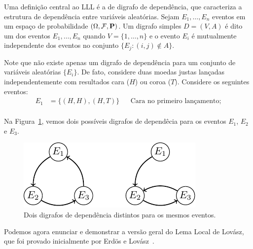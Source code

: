 Uma definição central ao LLL é a de digrafo de dependência, que caracteriza a estrutura de dependência entre variáveis aleatórias. Sejam $E_1, \dots, E_n$ eventos em um espaço de probabilidade $(\Omega, \mathcal{F}, \operatorname{\mathbf{P}})$. Um digrafo simples $D = (V,A)$ é dito um  dos eventos $E_1, \dots, E_n$ quando $V = \{1, \dots, n\}$ e o evento $E_i$ é mutualmente independente dos eventos no conjunto $\{ E_j : (i,j) \not\in A\}$.

Note que não existe apenas um digrafo de dependência para um conjunto de variáveis aleatórias $\{E_i\}$. De fato, considere duas moedas justas lançadas independentemente com resultados cara ($H$) ou coroa ($T$). Considere os seguintes eventos:
\begin{align*}
  E_1 &= \{ (H,H) , (H,T) \} && \text{Cara no primeiro lançamento;}\\
\end{align*}

Na Figura~\ref{prob:fig:ddigraph}, vemos dois possíveis digrafos de dependêcia para os eventos $E_1$, $E_2$ e $E_3$.

\begin{figure}[ht!]
\centering
\includegraphics{figures/4_prob_1_ddigraph}
\caption{Dois digrafos de dependência distintos para os mesmos eventos.}
\label{prob:fig:ddigraph}
\end{figure}

Podemos agora enunciar e demonstrar a versão geral do Lema Local de Lovász, que foi provado inicialmente por Erdös e Lovász~\cite{erdos1975problems}.

